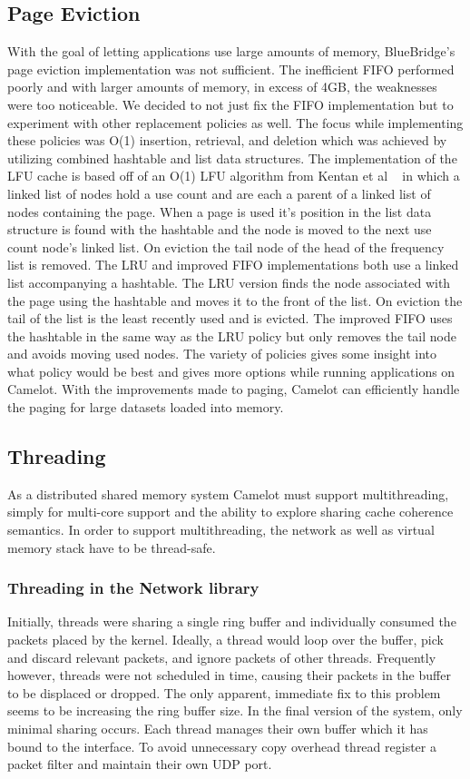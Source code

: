 \subsection{Page Eviction} 
With the goal of letting applications use large amounts of memory, BlueBridge's page eviction implementation was not sufficient. The inefficient FIFO performed poorly and with larger amounts of memory, in excess of 4GB, the weaknesses were too noticeable. We decided to not just fix the FIFO implementation but to experiment with other replacement policies as well. The focus while implementing these policies was O(1) insertion, retrieval, and deletion which was achieved by utilizing combined hashtable and list data structures. The implementation of the LFU cache is based off of an O(1) LFU algorithm from Kentan et al ~\cite{Ketan10ano(1)} in which a linked list of nodes hold a use count and are each a parent of a linked list of nodes containing the page. When a page is used it's position in the list data structure is found with the hashtable and the node is moved to the next use count node's linked list. On eviction the tail node of the head of the frequency list is removed. The LRU and improved FIFO implementations both use a linked list accompanying a hashtable. The LRU version finds the node associated with the page using the hashtable and moves it to the front of the list. On eviction the tail of the list is the least recently used and is evicted. The improved FIFO uses the hashtable in the same way as the LRU policy but only removes the tail node and avoids moving used nodes. The variety of policies gives some insight into what policy would be best and gives more options while running applications on Camelot. With the improvements made to paging, Camelot can efficiently handle the paging for large datasets loaded into memory.

\subsection{Threading} 
As a distributed shared memory system Camelot must support multithreading, simply for multi-core support and the ability to explore sharing cache coherence semantics.
In order to support multithreading, the network as well as virtual memory stack have to be thread-safe.
\subsubsection{Threading in the Network library}
Initially, threads were sharing a single ring buffer and individually consumed the packets placed by the kernel. Ideally, a thread would loop over the buffer, pick and discard relevant packets, and ignore packets of other threads. Frequently however, threads were not scheduled in time, causing their packets in the buffer to be displaced or dropped. The only apparent, immediate fix to this problem seems to be increasing the ring buffer size.
In the final version of the system, only minimal sharing occurs. Each thread manages their own buffer which it has bound to the interface. To avoid unnecessary copy overhead thread register a packet filter and maintain their own UDP port.

